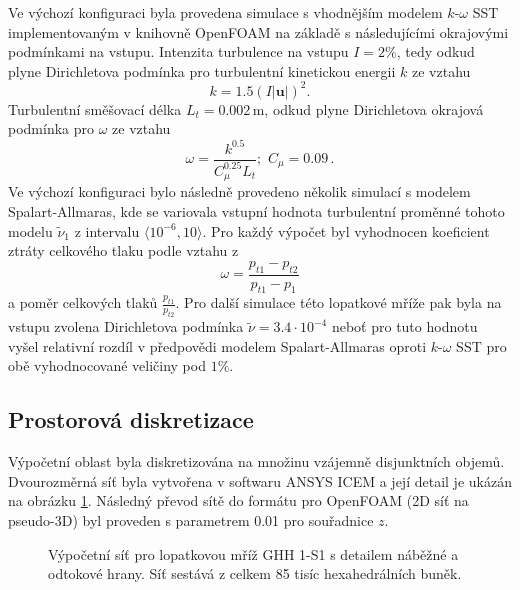 Ve výchozí konfiguraci byla provedena simulace s vhodnějším modelem $k\text{-}\omega$ SST implementovaným v knihovně OpenFOAM na základě \cite{menter1994two, menter2003ten, rumsey2013menter} s následujícími okrajovými podmínkami na vstupu. Intenzita turbulence na vstupu $ I=2\% $, tedy odkud plyne Dirichletova podmínka pro turbulentní kinetickou energii $ k $ ze vztahu  \begin{equation}\label{key}
k=1.5(I|\mathbf{u}|)^2.
\end{equation} 
Turbulentní směšovací délka $ L_t=0.002\,\mathrm{m} $, odkud plyne Dirichletova okrajová podmínka pro $ \omega $ ze vztahu
\begin{equation}\label{key}
\omega=\dfrac{k^{0.5}}{C_\mu^{0.25}L_t};\,\, C_\mu=0.09\,.
\end{equation} 
Ve výchozí konfiguraci bylo následně provedeno několik simulací s modelem Spalart-Allmaras, kde se variovala vstupní hodnota turbulentní proměnné tohoto modelu $ \tilde{\nu}_1 $ z intervalu $ \langle 10^{-6},10 \rangle $. Pro každý výpočet byl vyhodnocen koeficient ztráty celkového tlaku podle vztahu z \cite{steinert1990design}
\begin{equation}\label{key}
\omega = \dfrac{p_{t1}-p_{t2}}{p_{t1}-p_1}
\end{equation}
a poměr celkových tlaků $ \frac{p_{t1}}{p_{t2}} $. Pro další simulace této lopatkové mříže pak byla na vstupu zvolena Dirichletova podmínka $ \tilde{\nu} = 3.4\cdot 10^{-4} $ neboť pro tuto hodnotu vyšel relativní rozdíl v předpovědi modelem Spalart-Allmaras oproti $k\text{-}\omega$ SST pro obě vyhodnocované veličiny pod $ 1\% $.

\subsection{Prostorová diskretizace}

Výpočetní oblast byla diskretizována na množinu vzájemně disjunktních objemů. Dvourozměrná síť byla vytvořena v softwaru ANSYS ICEM a její detail je ukázán na obrázku \ref{fig:ghs1_sit}. Následný převod sítě do formátu pro OpenFOAM (2D síť na pseudo-3D) byl proveden s parametrem 0.01 pro souřadnice $ z $.

\begin{figure}
	\centering
	\def\svgwidth{1\textwidth}
	\graphicspath{{img/inkscape/}}
	
	\caption[Výpočetní síť mříže GHH 1-S1]{Výpočetní síť pro lopatkovou mříž GHH 1-S1 s detailem náběžné a odtokové hrany. Síť sestává z celkem 85 tisíc hexahedrálních buněk. }
	\label{fig:ghs1_sit}
\end{figure}

